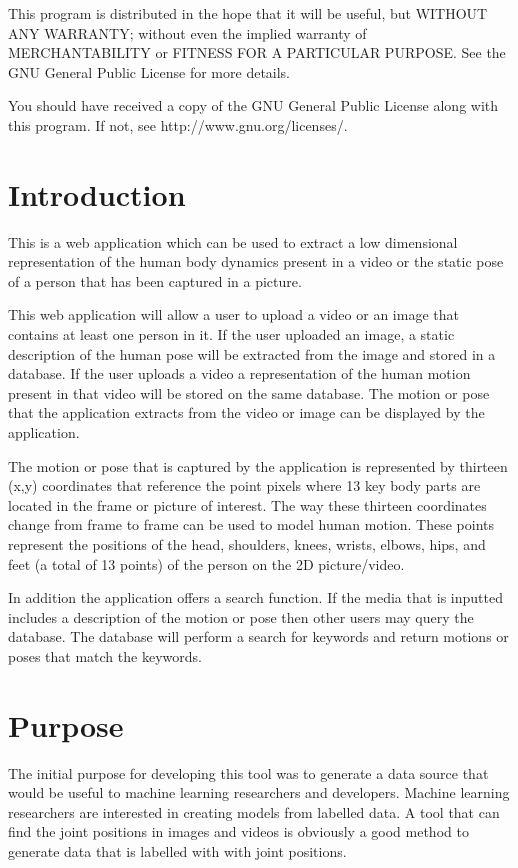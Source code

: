 \documentclass{scrreprt}
\begin{document}
    This program is distributed in the hope that it will be useful,
    but WITHOUT ANY WARRANTY; without even the implied warranty of
    MERCHANTABILITY or FITNESS FOR A PARTICULAR PURPOSE.  See the
    GNU General Public License for more details.

    You should have received a copy of the GNU General Public License
    along with this program.  If not, see http://www.gnu.org/licenses/.


\section{Introduction}

This is a web application which can be used to extract a low dimensional
representation of the human body dynamics present in a video or the static pose
of a person that has been captured in a picture.

This web application will allow a user to upload a video or an image that
contains at least one person in it. If the user uploaded an image, a static
description of the human pose will be extracted from the image and stored in a
database. If the user uploads a video a representation of the human motion
present in that video will be stored on the same database.  The motion or pose
that the application extracts from the video or image can be displayed by the
application.

The motion or pose that is captured by the application is represented by
thirteen (x,y) coordinates that reference the point pixels where 13 key body
parts are located in the frame or picture of interest.  The way these thirteen
coordinates change from frame to frame can be used to model human motion.
These points represent the positions of the head, shoulders, knees, wrists,
elbows, hips, and feet (a total of 13 points) of the person on the 2D
picture/video.

In addition the application offers a search function.  If the media that is
inputted includes a description of the motion or pose then other users may
query the database.  The database will perform a search for keywords and return
motions or poses that match the keywords.

\section{Purpose}

The initial purpose for developing this tool was to generate a data source that
would be useful to machine learning researchers and developers.  Machine
learning researchers are interested in creating models from labelled data.  A
tool that can find the joint positions in images and videos is obviously a good
method to generate data that is labelled with with joint positions.
\end{document}
